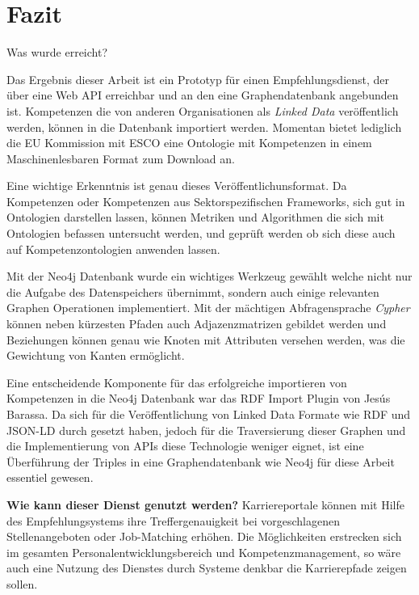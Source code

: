 \section{Fazit}\label{fazit}

Was wurde erreicht?

Das Ergebnis dieser Arbeit ist ein Prototyp für einen Empfehlungsdienst, der über eine Web API erreichbar und an den eine Graphendatenbank angebunden ist. Kompetenzen die von anderen Organisationen als \textit{Linked Data} veröffentlich werden, können in die Datenbank importiert werden. Momentan bietet lediglich die EU Kommission mit ESCO eine Ontologie mit Kompetenzen in einem Maschinenlesbaren Format zum Download an. 

Eine wichtige Erkenntnis ist genau dieses Veröffentlichunsformat. Da Kompetenzen oder Kompetenzen aus Sektorspezifischen Frameworks, sich gut in Ontologien darstellen lassen, können Metriken und Algorithmen die sich mit Ontologien befassen untersucht werden, und geprüft werden ob sich diese auch auf Kompetenzontologien anwenden lassen.

Mit der Neo4j Datenbank wurde ein wichtiges Werkzeug gewählt welche nicht nur die Aufgabe des Datenspeichers übernimmt, sondern auch einige relevanten Graphen Operationen implementiert. Mit der mächtigen Abfragensprache \textit{Cypher} können neben kürzesten Pfaden auch Adjazenzmatrizen gebildet werden und Beziehungen können genau wie Knoten mit Attributen versehen werden, was die Gewichtung von Kanten ermöglicht.\newline

Eine entscheidende Komponente für das erfolgreiche importieren von Kompetenzen in die Neo4j Datenbank war das RDF Import Plugin von Jesús Barassa. Da sich für die Veröffentlichung von Linked Data Formate wie RDF und JSON-LD durch gesetzt haben, jedoch für die Traversierung dieser Graphen und die Implementierung von APIs diese Technologie weniger eignet, ist eine Überführung der Triples in eine Graphendatenbank wie Neo4j für diese Arbeit essentiel gewesen.
\newline

\textbf{Wie kann dieser Dienst genutzt werden? } \newline
Karriereportale können mit Hilfe des Empfehlungsystems ihre Treffergenauigkeit bei vorgeschlagenen Stellenangeboten oder Job-Matching erhöhen. Die Möglichkeiten erstrecken sich im gesamten Personalentwicklungsbereich und Kompetenzmanagement, so wäre auch eine Nutzung des Dienstes durch Systeme denkbar die Karrierepfade zeigen sollen. 
 
